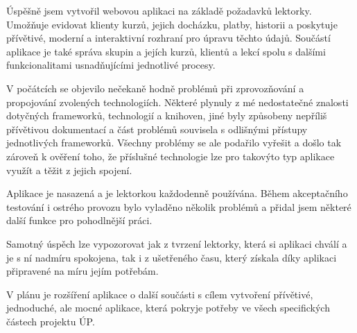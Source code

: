 Úspěšně jsem vytvořil webovou aplikaci na základě požadavků lektorky. Umožňuje evidovat klienty kurzů, jejich docházku, platby, historii a poskytuje přívětivé, moderní a interaktivní rozhraní pro úpravu těchto údajů. Součástí aplikace je také správa skupin a jejích kurzů, klientů a lekcí spolu s dalšími funkcionalitami usnadňujícími jednotlivé procesy.

V počátcích se objevilo nečekaně hodně problémů při zprovozňování a propojování zvolených technologiích. Některé plynuly z mé nedostatečné znalosti dotyčných frameworků, technologií a knihoven, jiné byly způsobeny nepříliš přívětivou dokumentací a část problémů souvisela s odlišnými přístupy jednotlivých frameworků. Všechny problémy se ale podařilo vyřešit a došlo tak zároveň k ověření toho, že příslušné technologie lze pro takovýto typ aplikace využít a těžit z jejich spojení.

Aplikace je nasazená a je lektorkou každodenně používána. Během akceptačního testování i ostrého provozu bylo vyladěno několik problémů a přidal jsem některé další funkce pro pohodlnější práci.

Samotný úspěch lze vypozorovat jak z tvrzení lektorky, která si aplikaci chválí a je s ní nadmíru spokojena, tak i z ušetřeného času, který získala díky aplikaci připravené na míru jejím potřebám.

V plánu je rozšíření aplikace o další součásti s cílem vytvoření přívětivé, jednoduché, ale mocné aplikace, která pokryje potřeby ve všech specifických částech projektu ÚP.